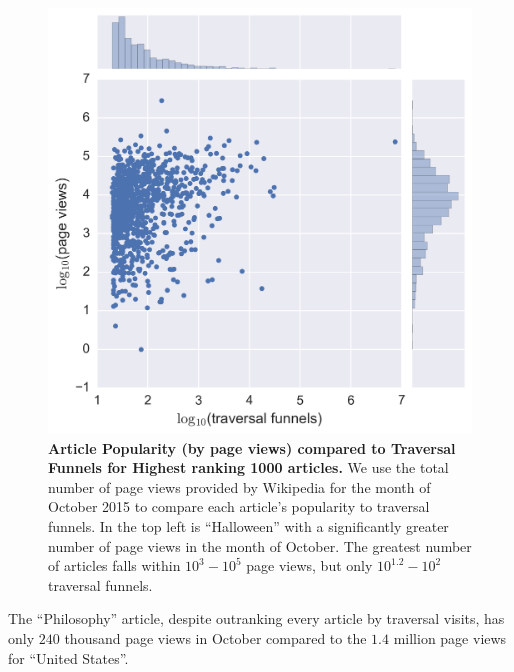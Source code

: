 \documentclass[11pt]{report}
\begin{document}
\begin{figure}[tp!]
  \includegraphics[width=\columnwidth]{graphics/funnels_visits.png}
  \caption{
    \textbf{Article Popularity (by page views) compared to Traversal Funnels
    for Highest ranking 1000 articles.}
We use the total number of page views provided by Wikipedia for the month
of October 2015 to compare each article's popularity to traversal funnels.
In the top left is ``Halloween'' with a significantly greater 
number of page views in the month of October. 
The greatest number of articles falls within $10^3-10^5$ page views, 
but only $10^{1.2}-10^2$ traversal funnels.}
  \label{fig:Views and Funnels}
\end{figure}
The ``Philosophy'' article, despite outranking every article by traversal visits,
has only $240$ thousand page views in October compared to the $1.4$ million
page views for ``United States''.
\end{document}
